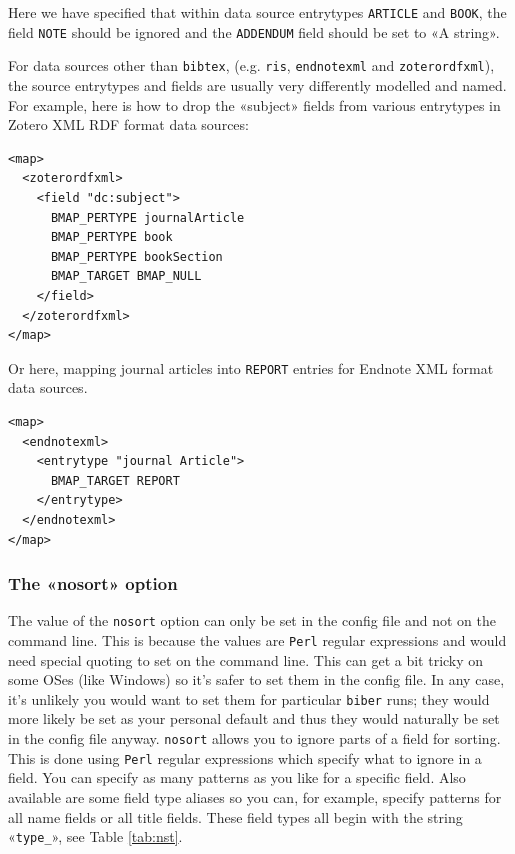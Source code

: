 \documentclass{ltxdockit}
\begin{document}
\noindent Here we have specified that within data
source entrytypes \verb+ARTICLE+ and \verb+BOOK+, the field \verb+NOTE+
should be ignored and the \verb+ADDENDUM+ field should be set to «A
string».

For data sources other than \verb+bibtex+, (e.g. \verb+ris+,
\verb+endnotexml+ and \verb+zoterordfxml+), the source entrytypes and
fields are usually very differently modelled and named. For example, here
is how to drop the «subject» fields from various entrytypes in Zotero XML
RDF format data sources:

\lstset{showspaces=false}
\begin{lstlisting}[escapechar=+,mathescape=true]
<map>
  <zoterordfxml>
    <field "dc:subject">
      BMAP_PERTYPE journalArticle
      BMAP_PERTYPE book
      BMAP_PERTYPE bookSection
      BMAP_TARGET BMAP_NULL
    </field>
  </zoterordfxml>
</map>
\end{lstlisting}

\noindent Or here, mapping journal articles into \verb+REPORT+ entries for
Endnote XML format data sources.

\lstset{showspaces=false}
\begin{lstlisting}[escapechar=+,mathescape=true]
<map>
  <endnotexml>
    <entrytype "journal Article">
      BMAP_TARGET REPORT
    </entrytype>
  </endnotexml>
</map>
\end{lstlisting}
\bigskip
\subsubsection{The «nosort» option}

The value of the \verb+nosort+ option can only be set in the config file
and not on the command line. This is because the values are \verb+Perl+ regular
expressions and would need special quoting to set on the command line. This
can get a bit tricky on some OSes (like Windows) so it's safer to set them
in the config file. In any case, it's unlikely you would want to set them
for particular \verb+biber+ runs; they would more likely be set as your
personal default and thus they would naturally be set in the config file
anyway. \verb+nosort+ allows you to ignore parts of a field for sorting.
This is done using \verb+Perl+ regular expressions which specify what to
ignore in a field. You can specify as many patterns as you like for a
specific field. Also available are some field type aliases so you can, for
example, specify patterns for all name fields or all title fields. These
field types all begin with the string «\verb+type_+», see Table
\ref{tab:nst}.
\end{document}
